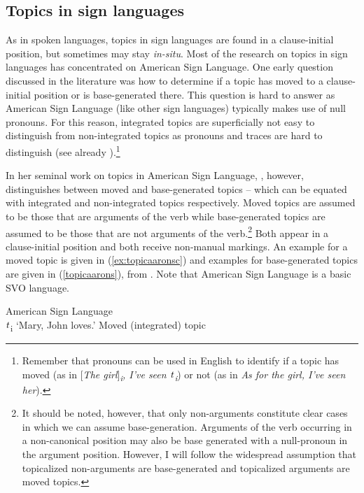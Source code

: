 \subsection{Topics in sign languages}\label{topicsinsignlanguages}
As in spoken languages, topics in sign languages are found in a clause-initial position, but sometimes may stay \textit{in-situ}. Most of the research on topics in sign languages has concentrated on American Sign Language. One early question discussed in the literature was how to determine if a topic has moved to a clause-initial position or is base-generated there. This question is hard to answer as American Sign Language (like other sign languages) typically makes use of null pronouns. For this reason, integrated topics are superficially not easy to distinguish from non-integrated topics as pronouns and traces are hard to distinguish (see already \citealt{lillo1986two, lillo1986parameter}).\footnote{ Remember that pronouns can be used in English to identify if a topic has moved (as in \textit{$[$The girl$]$\textsubscript{i}, I've seen $\textrm{\textit{t}}$\textsubscript{i}}) or not (as in \textit{As for the girl, I've seen her}).}

In her seminal work on topics in American Sign Language, \citet{aarons1994aspects, aarons1996topics}, however, distinguishes between moved and base-generated topics -- which can be equated with integrated and non-integrated topics respectively. Moved topics are assumed to be those that are arguments of the verb while base-generated topics are assumed to be those that are not arguments of the verb.\footnote{ It should be noted, however, that only non-arguments constitute clear cases in which we can assume base-generation. Arguments of the verb occurring in a non-canonical position may also be base generated with a null-pronoun in the argument position. However, I will follow the widespread assumption that topicalized non-arguments are base-generated and topicalized arguments are moved topics.} Both appear in a clause-initial position and both receive non-manual markings. An example for a moved topic is given in (\ref{ex:topicaaronsc}) and examples for base-generated topics are given in (\ref{topicaarons}), from \citet{aarons1996topics}. Note that American Sign Language is a basic SVO language.

\begin{exe}
\ex American Sign Language \\   $\textrm{\textit{t}}$\textsubscript{i}
\glt `Mary, John loves.' \label{ex:topicaaronsc} \hfill Moved (integrated) topic
\end{exe} 

